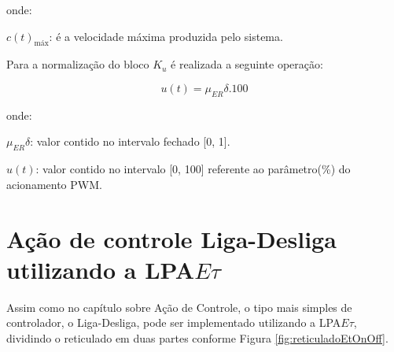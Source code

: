 onde:

$c(t)_{\text{máx}}$: é a velocidade máxima produzida pelo sistema.


Para a normalização do bloco $K_u$ é realizada a seguinte operação:

\begin{equation}
u(t) = \mu_{ER}\delta . 100
\end{equation}

onde:

$\mu_{ER}\delta$: valor contido no intervalo fechado [0, 1].

$u(t)$: valor contido no intervalo [0, 100] 
referente ao parâmetro(\%) do acionamento PWM.



\newpage


\section{Ação de controle Liga-Desliga utilizando a LPA$E\tau$}

Assim como no capítulo sobre Ação de Controle, 
o tipo mais simples de controlador, o Liga-Desliga,
pode ser implementado utilizando a 
LPA$E\tau$, 
dividindo o reticulado em duas partes conforme 
Figura \ref{fig:reticuladoEtOnOff}.





